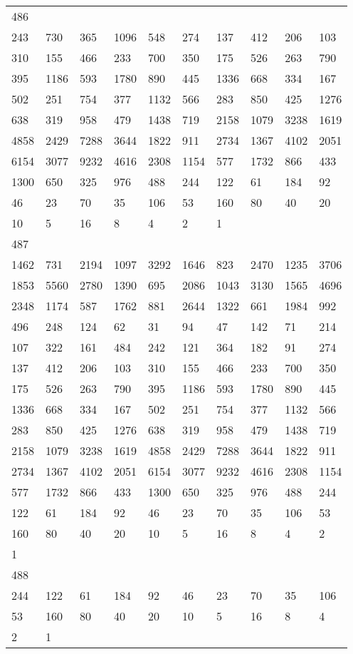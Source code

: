 \begin{longtable}{*{10}{l}}
486&&&&&&&&&\\
243& 730& 365& 1096& 548& 274& 137& 412& 206& 103\\
310& 155& 466& 233& 700& 350& 175& 526& 263& 790\\
395& 1186& 593& 1780& 890& 445& 1336& 668& 334& 167\\
502& 251& 754& 377& 1132& 566& 283& 850& 425& 1276\\
638& 319& 958& 479& 1438& 719& 2158& 1079& 3238& 1619\\
4858& 2429& 7288& 3644& 1822& 911& 2734& 1367& 4102& 2051\\
6154& 3077& 9232& 4616& 2308& 1154& 577& 1732& 866& 433\\
1300& 650& 325& 976& 488& 244& 122& 61& 184& 92\\
46& 23& 70& 35& 106& 53& 160& 80& 40& 20\\
10& 5& 16& 8& 4& 2& 1& \\

487&&&&&&&&&\\
1462& 731& 2194& 1097& 3292& 1646& 823& 2470& 1235& 3706\\
1853& 5560& 2780& 1390& 695& 2086& 1043& 3130& 1565& 4696\\
2348& 1174& 587& 1762& 881& 2644& 1322& 661& 1984& 992\\
496& 248& 124& 62& 31& 94& 47& 142& 71& 214\\
107& 322& 161& 484& 242& 121& 364& 182& 91& 274\\
137& 412& 206& 103& 310& 155& 466& 233& 700& 350\\
175& 526& 263& 790& 395& 1186& 593& 1780& 890& 445\\
1336& 668& 334& 167& 502& 251& 754& 377& 1132& 566\\
283& 850& 425& 1276& 638& 319& 958& 479& 1438& 719\\
2158& 1079& 3238& 1619& 4858& 2429& 7288& 3644& 1822& 911\\
2734& 1367& 4102& 2051& 6154& 3077& 9232& 4616& 2308& 1154\\
577& 1732& 866& 433& 1300& 650& 325& 976& 488& 244\\
122& 61& 184& 92& 46& 23& 70& 35& 106& 53\\
160& 80& 40& 20& 10& 5& 16& 8& 4& 2\\
1& \\

488&&&&&&&&&\\
244& 122& 61& 184& 92& 46& 23& 70& 35& 106\\
53& 160& 80& 40& 20& 10& 5& 16& 8& 4\\
2& 1& \\


\end{longtable}
